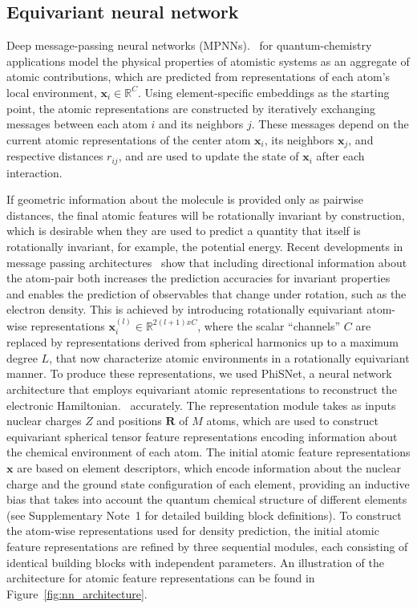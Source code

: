 \documentclass[12pt]{article}
\begin{document}
\subsection{Equivariant neural network}\label{sec:equiv_net}
Deep message-passing neural networks (MPNNs).~\citep{gilmer2017neural} for quantum-chemistry applications model the physical properties of atomistic systems as an aggregate of atomic contributions, which are predicted from representations of each atom's local environment, $\mathbf{x}_i \in \mathbb{R}^C$. Using element-specific embeddings as the starting point, the atomic representations are constructed by iteratively exchanging messages between each atom $i$ and its neighbors $j$. These messages depend on the current atomic representations of the center atom $\mathbf{x}_i$, its neighbors $\mathbf{x}_j$, and respective distances $r_{ij}$, and are used to update the state of $\mathbf{x}_i$ after each interaction.

If geometric information about the molecule is provided only as pairwise distances, the final atomic features will be rotationally invariant by construction, which is desirable when they are used to predict a quantity that itself is rotationally invariant, for example, the potential energy. Recent developments in message passing architectures~\citep{batzner2021nequip,schutt2021equivariant, unke2021spookynet} show that including directional information about the atom-pair both increases the prediction accuracies for invariant properties and enables the prediction of observables that change under rotation, such as the electron density. This is achieved by introducing rotationally equivariant atom-wise representations $\mathbf{x}_i^{(l)}\in \mathbb{R}^{2(l+1)xC}$, where the scalar ``channels'' $C$ are replaced by representations derived from spherical harmonics up to a maximum degree $L$, that now characterize atomic environments in a rotationally equivariant manner. To produce these representations, we used PhiSNet, a neural network architecture that employs equivariant atomic representations to reconstruct the electronic Hamiltonian.~\citep{unke2021se} accurately. The representation module takes as inputs nuclear charges $Z$ and positions $\mathbf{R}$ of $M$ atoms, which are used to construct equivariant spherical tensor feature representations encoding information about the chemical environment of each atom. 
The initial atomic feature representations $\mathbf{x}$ are based on element descriptors, which encode information about the nuclear charge and the ground state configuration of each element, providing an inductive bias that takes into account the quantum chemical structure of different elements (see Supplementary Note~1 for detailed building block definitions). To construct the atom-wise representations used for density prediction, the initial atomic feature representations are refined by three sequential modules, each consisting of identical building blocks with independent parameters. 
An illustration of the architecture for atomic feature representations can be found in Figure~\ref{fig:nn_architecture}.
\end{document}
